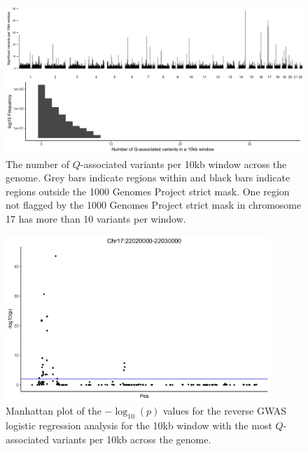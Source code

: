 \documentclass[9pt,lineno]{template}
\begin{document}
\begin{figure}[h]
\centering
\includegraphics[width=15cm,keepaspectratio]{../Figures/VariantDensity.jpg}
\caption{The number of $Q$-associated variants per 10kb window across the genome.
Grey bars indicate regions within and black bars indicate regions outside the 1000 Genomes Project strict mask.
One region not flagged by the 1000 Genomes Project strict mask in chromosome 17 has more than 10 variants per window.}  
\label{VariantDensity}
\end{figure}

\begin{figure}[h]
\centering
\includegraphics[width=10cm,keepaspectratio]{../Figures/RegionOver10.jpg}
\caption{Manhattan plot of the $-\log_{10}(p)$ values for the reverse GWAS logistic regression analysis for the 10kb window with the most  $Q$-associated variants per 10kb across the genome.}  
\label{Top10}
\end{figure}
\end{document}
